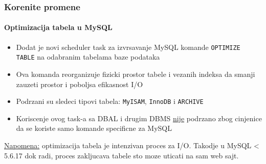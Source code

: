 \begin{frame}[fragile]
	\frametitle{Korenite promene}
	\framesubtitle{Optimizacija tabela u MySQL}

	\begin{itemize}

		\item Dodat je novi scheduler task za izvrsavanje MySQL komande \texttt{OPTIMIZE TABLE}
			na odabranim tabelama baze podataka

		\item Ova komanda reorganizuje fizicki prostor tabele i vezanih indeksa da smanji zauzeti prostor i poboljsa efikasnost I/O

		\item Podrzani su sledeci tipovi tabela:\newline
			\texttt{MyISAM}, \texttt{InnoDB} i \texttt{ARCHIVE}

		\item Koriscenje ovog task-a sa DBAL i drugim DBMS  \underline{nije} podrzano
			zbog cinjenice da se koriste samo komande specificne za MySQL 

	\end{itemize}


	\begingroup
		\color{red}
			\small
				\underline{Napomena:} optimizacija tabela je intenzivan proces za I/O.
				Takodje u MySQL < 5.6.17 dok radi, proces zakljucava tabele sto moze uticati na sam web sajt.
			\normalsize
	\endgroup

\end{frame}


